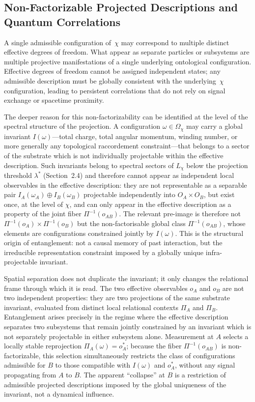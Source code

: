 \subsection{Non-Factorizable Projected Descriptions and Quantum Correlations}
  \label{subsec:non-injective-projection}

  A single admissible configuration of~$\chi$ may correspond to multiple
  distinct effective degrees of freedom.
  What appear as separate particles or subsystems are multiple projective
  manifestations of a single underlying ontological configuration.
  Effective degrees of freedom cannot be assigned independent states; any
  admissible description must be globally consistent with the
  underlying~$\chi$ configuration, leading to persistent correlations that
  do not rely on signal exchange or spacetime proximity.

  The deeper reason for this non-factorizability can be identified at the level of the
  spectral structure of the projection.
  A configuration $\omega \in \Omega_\chi$ may carry a global invariant $I(\omega)$---total
  charge, total angular momentum, winding number, or more generally any topological
  raccordement constraint---that belongs to a sector of the substrate which is not
  individually projectable within the effective description.
  Such invariants belong to spectral sectors of $L_\chi$ below the projection threshold
  $\lambda^*$ (Section~2.4) and therefore cannot appear as independent local observables
  in the effective description: they are not representable as a separable pair
  $I_A(\omega_A) \oplus I_B(\omega_B)$ projectable independently into $O_A \times O_B$,
  but exist once, at the level of $\chi$, and can only appear in the effective description
  as a property of the joint fiber $\Pi^{-1}(o_{AB})$.
  The relevant pre-image is therefore not $\Pi^{-1}(o_A) \times \Pi^{-1}(o_B)$ but the
  non-factorisable global class $\Pi^{-1}(o_{AB})$, whose elements are configurations
  constrained jointly by $I(\omega)$.
  This is the structural origin of entanglement: not a causal memory of past interaction,
  but the irreducible representation constraint imposed by a globally unique infra-projectable
  invariant.

  Spatial separation does not duplicate the invariant; it only changes the relational frame
  through which it is read.
  The two effective observables $o_A$ and $o_B$ are not two independent properties: they
  are two projections of the same substrate invariant, evaluated from distinct local relational
  contexts $\Pi_A$ and $\Pi_B$.
  Entanglement arises precisely in the regime where the effective description separates
  two subsystems that remain jointly constrained by an invariant which is not separately
  projectable in either subsystem alone.
  Measurement at $A$ selects a locally stable reprojection $\Pi_A(\omega) = o_A^*$; because
  the fiber $\Pi^{-1}(o_{AB})$ is non-factorizable, this selection simultaneously restricts the
  class of configurations admissible for $B$ to those compatible with $I(\omega)$ and $o_A^*$,
  without any signal propagating from $A$ to $B$.
  The apparent ``collapse'' at $B$ is a restriction of admissible projected descriptions
  imposed by the global uniqueness of the invariant, not a dynamical influence.

